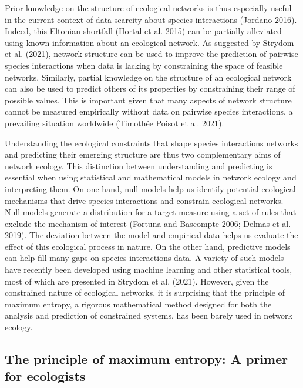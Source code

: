 \documentclass[11pt]{article}
\begin{document}
Prior knowledge on the structure of ecological networks is thus
especially useful in the current context of data scarcity about species
interactions (Jordano 2016). Indeed, this Eltonian shortfall (Hortal et
al. 2015) can be partially alleviated using known information about an
ecological network. As suggested by Strydom et al. (2021), network
structure can be used to improve the prediction of pairwise species
interactions when data is lacking by constraining the space of feasible
networks. Similarly, partial knowledge on the structure of an ecological
network can also be used to predict others of its properties by
constraining their range of possible values. This is important given
that many aspects of network structure cannot be measured empirically
without data on pairwise species interactions, a prevailing situation
worldwide (Timothée Poisot et al. 2021).

Understanding the ecological constraints that shape species interactions
networks and predicting their emerging structure are thus two
complementary aims of network ecology. This distinction between
understanding and predicting is essential when using statistical and
mathematical models in network ecology and interpreting them. On one
hand, null models help us identify potential ecological mechanisms that
drive species interactions and constrain ecological networks. Null
models generate a distribution for a target measure using a set of rules
that exclude the mechanism of interest (Fortuna and Bascompte 2006;
Delmas et al. 2019). The deviation between the model and empirical data
helps us evaluate the effect of this ecological process in nature. On
the other hand, predictive models can help fill many gaps on species
interactions data. A variety of such models have recently been developed
using machine learning and other statistical tools, most of which are
presented in Strydom et al. (2021). However, given the constrained
nature of ecological networks, it is surprising that the principle of
maximum entropy, a rigorous mathematical method designed for both the
analysis and prediction of constrained systems, has been barely used in
network ecology.

\hypertarget{the-principle-of-maximum-entropy-a-primer-for-ecologists}{%
\subsection{The principle of maximum entropy: A primer for
ecologists}\label{the-principle-of-maximum-entropy-a-primer-for-ecologists}}
\end{document}
